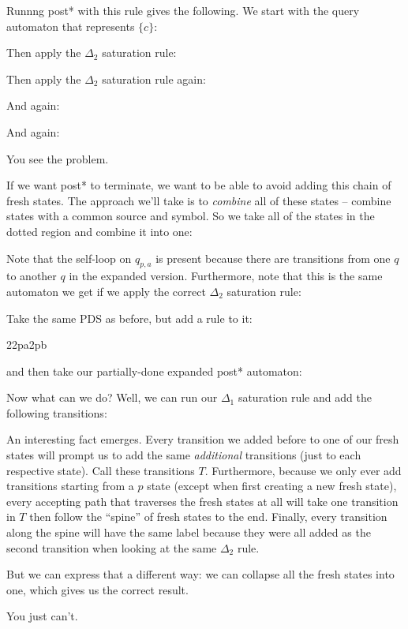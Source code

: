 \documentclass{article}
\newcommand{\config}{2}{\ensuremath{\langle #1, #2 \rangle}}
\newcommand{\rule}{2}{\ensuremath{#1 \righthookarrow #2}}
\begin{document}
\begin{defintion}
Runnng post* with this rule gives the following. We start with the
query automaton that represents $\{c\}$:

Then apply the $\Delta_2$ saturation rule:

Then apply the $\Delta_2$ saturation rule again:

And again:

And again:

You see the problem.

If we want post* to terminate, we want to be able to avoid adding this
chain of fresh states. The approach we'll take is to \emph{combine}
all of these states -- combine states with a common source and
symbol. So we take all of the states in the dotted region and combine
it into one:


Note that the self-loop on $q_{p,a}$ is present because there are
transitions from one $q$ to another $q$ in the expanded
version. Furthermore, note that this is the same automaton we get if
we apply the correct $\Delta_2$ saturation rule:



Take the same PDS as before, but add a rule to it:

    \rule{\config{p}{a}}{\config{p}{b}}

and then take our partially-done expanded post* automaton:

Now what can we do? Well, we can run our $\Delta_1$ saturation rule
and add the following transitions:


An interesting fact emerges. Every transition we added before to one
of our fresh states will prompt us to add the same \emph{additional}
transitions (just to each respective state). Call these transitions
$T$.  Furthermore, because we only ever add transitions starting from
a $p$ state (except when first creating a new fresh state), every
accepting path that traverses the fresh states at all will take one
transition in $T$ then follow the ``spine'' of fresh states to the
end. Finally, every transition along the spine will have the same
label because they were all added as the second transition when
looking at the same $\Delta_2$ rule.

But we can express that a different way: we can collapse all the fresh
states into one, which gives us the correct result.


You just can't.


\end{defintion}
\end{document}
